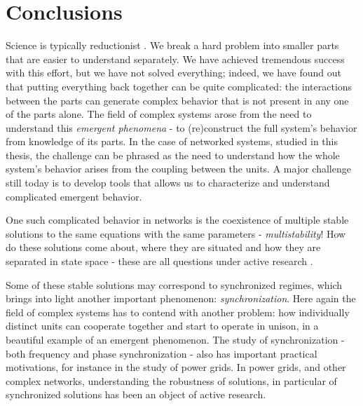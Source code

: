 \chapter{Conclusions}\label{chap:conclusions}

Science is typically reductionist \cite{strogatzsyncbook}. We break a hard problem into smaller parts that are easier to understand separately. We have achieved tremendous success with this effort, but we have not solved everything; indeed, we have found out that putting everything back together can be quite complicated: the interactions between the parts can generate complex behavior that is not present in any one of the parts alone.
The field of complex systems arose from the need to understand this \textit{emergent phenomena} - to (re)construct the full system's behavior from knowledge of its parts. In the case of networked systems, studied in this thesis, the challenge can be phrased as the need to understand how the whole system's behavior arises from the coupling between the units. A major challenge still today is to develop tools that allows us to characterize and understand complicated emergent behavior.

One such complicated behavior in networks is the coexistence of multiple stable solutions to the same equations with the same parameters - \textit{multistability}! How do these solutions come about, where they are situated and how they are separated in state space - these are all questions under active research \cite{feudel2008complex, pisarchik2022multistability, zhang2021basins}. 

Some of these stable solutions may correspond to synchronized regimes, which brings into light another important phenomenon: \textit{synchronization}. Here again the field of complex systems has to contend with another problem: how individually distinct units can cooperate together and start to operate in unison, in a beautiful example of an emergent phenomenon. The study of synchronization - both frequency and phase synchronization - also has important practical motivations, for instance in the study of power grids. In power grids, and other complex networks, understanding the robustness of solutions, in particular of synchronized solutions has been an object of active research. 

